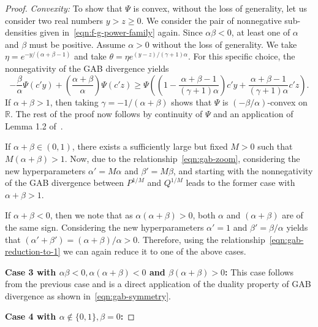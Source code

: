 \documentclass[11pt]{article}
\theoremstyle{plain}
\theoremstyle{remark}
\def\R{\mathbb{R}}
\begin{document}
\begin{proof}
    \noindent\emph{Convexity:} To show that $\Psi$ is convex, without the loss of generality, let us consider two real numbers $y > z \geq 0$. We consider the pair of nonnegative sub-densities given in~\eqref{eqn:f-g-power-family} again. Since $\alpha\beta < 0$, at least one of $\alpha$ and $\beta$ must be positive. Assume $\alpha > 0$ without the loss of generality. We take $\eta = e^{-y/(\alpha+\beta-1)}$ and take $\theta = \eta e^{(y-z)/(\gamma+1)\alpha}$. For this specific choice, the nonnegativity of the GAB divergence yields
    \begin{equation*}
        -\dfrac{\beta}{\alpha}\Psi\left(c' y \right) + \left( \dfrac{\alpha+\beta}{\alpha} \right) \Psi(c' z)
        \geq \Psi\left( \left( 1 - \dfrac{\alpha+\beta-1}{(\gamma+1)\alpha} \right)c' y + \dfrac{\alpha+\beta-1}{(\gamma+1)\alpha}c' z \right).
    \end{equation*}
    \noindent If $\alpha+\beta > 1$, then taking $\gamma = -1/(\alpha+\beta)$ shows that $\Psi$ is $(-\beta/\alpha)$-convex on $\R$. The rest of the proof now follows by continuity of $\Psi$ and an application of Lemma 1.2 of~\citep{ray2023functional}.

    If $\alpha + \beta \in (0, 1)$, there exists a sufficiently large but fixed $M > 0$ such that $M(\alpha+\beta) > 1$. Now, due to the relationship~\eqref{eqn:gab-zoom}, considering the new hyperparameters $\alpha' = M\alpha$ and $\beta' = M\beta$, and starting with the nonnegativity of the GAB divergence between $P^{1/M}$ and $Q^{1/M}$ leads to the former case with $\alpha + \beta > 1$.

    If $\alpha + \beta < 0$, then we note that as $\alpha(\alpha+\beta) > 0$, both $\alpha$ and $(\alpha+\beta)$ are of the same sign. Considering the new hyperparameters $\alpha' = 1$ and $\beta' = \beta/\alpha$ yields that $(\alpha'+\beta') = (\alpha+\beta)/\alpha > 0$. Therefore, using the relationship~\eqref{eqn:gab-reduction-to-1} we can again reduce it to one of the above cases.

    \noindent\textbf{Case 3 with $\alpha\beta < 0, \alpha(\alpha+\beta) < 0$ and $\beta(\alpha+\beta) > 0$:} This case follows from the previous case and is a direct application of the duality property of GAB divergence as shown in~\eqref{eqn:gab-symmetry}.


    \noindent\textbf{Case 4 with $\alpha \notin \{0, 1\}, \beta = 0$:}


\end{proof}
\end{document}
